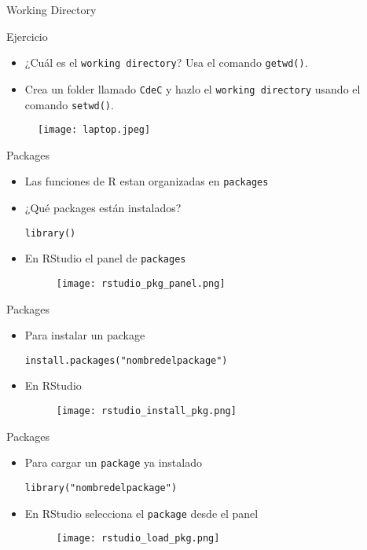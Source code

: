 \documentclass{beamer}
\begin{document}
\begin{frame}{Working Directory}
\begin{block}{Ejercicio}
\begin{itemize}
\item ¿Cuál es el \texttt{working directory}? Usa el comando \texttt{getwd()}.
\item Crea un folder llamado \texttt{CdeC} y hazlo el \texttt{working directory} usando el comando \texttt{setwd()}.
\end{itemize}
\end{block}
\begin{figure}[H]
\centering
\texttt{[image: laptop.jpeg]}
\end{figure}
\end{frame}

\begin{frame}[fragile]{Packages}
\begin{itemize}
\item Las funciones de R estan organizadas en \texttt{packages}
\item ¿Qué packages están instalados?
\begin{verbatim}
library()
\end{verbatim}
\item En RStudio el panel de \texttt{packages}
\begin{figure}[H]
\centering
\texttt{[image: rstudio\_pkg\_panel.png]}
\end{figure}
\end{itemize}
\end{frame}

\begin{frame}[fragile]{Packages}
\begin{itemize}
\item Para instalar un package
\begin{verbatim}
install.packages("nombredelpackage")
\end{verbatim}
\item En RStudio
\begin{figure}[H]
\centering
\texttt{[image: rstudio\_install\_pkg.png]}
\end{figure}
\end{itemize}
\end{frame}

\begin{frame}[fragile]{Packages}
\begin{itemize}
\item Para cargar un \texttt{package} ya instalado
\begin{verbatim}
library("nombredelpackage")
\end{verbatim}
\item En RStudio selecciona el \texttt{package} desde el panel 
\begin{figure}[H]
\centering
\texttt{[image: rstudio\_load\_pkg.png]}
\end{figure}
\end{itemize}
\end{frame}
\end{document}
